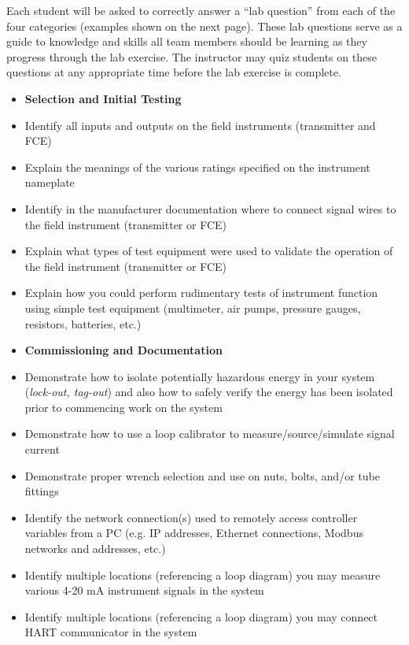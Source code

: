 \documentclass[12pt,a4paper]{article}
\begin{document}
Each student will be asked to correctly answer a ``lab question'' from each of the four categories (examples shown on the next page).  These lab questions serve as a guide to knowledge and skills all team members should be learning as they progress through the lab exercise.  The instructor may quiz students on these questions at any appropriate time before the lab exercise is complete.

\vfil \eject

\noindent
{} 

\begin{itemize}
\item{} {\bf Selection and Initial Testing}
\item{} Identify all inputs and outputs on the field instruments (transmitter and FCE)
\item{} Explain the meanings of the various ratings specified on the instrument nameplate
\item{} Identify in the manufacturer documentation where to connect signal wires to the field instrument (transmitter or FCE)
\item{} Explain what types of test equipment were used to validate the operation of the field instrument (transmitter or FCE)
\item{} Explain how you could perform rudimentary tests of instrument function using simple test equipment (multimeter, air pumps, pressure gauges, resistors, batteries, etc.)
\end{itemize}

\filbreak

\begin{itemize}
\item{} {\bf Commissioning and Documentation}
\item{} Demonstrate how to isolate potentially hazardous energy in your system ({\it lock-out, tag-out}) and also how to safely verify the energy has been isolated prior to commencing work on the system
\item{} Demonstrate how to use a loop calibrator to measure/source/simulate signal current
\item{} Demonstrate proper wrench selection and use on nuts, bolts, and/or tube fittings
\item{} Identify the network connection(s) used to remotely access controller variables from a PC (e.g. IP addresses, Ethernet connections, Modbus networks and addresses, etc.)
\item{} Identify multiple locations (referencing a loop diagram) you may measure various 4-20 mA instrument signals in the system
\item{} Identify multiple locations (referencing a loop diagram) you may connect HART communicator in the system
\end{itemize}
\end{document}
